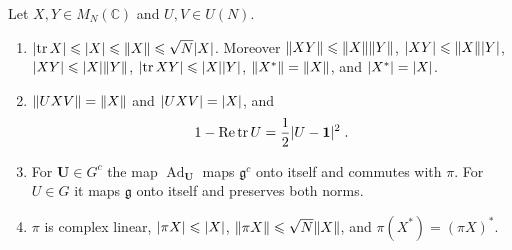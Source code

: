 \documentclass[11pt]{preprint}
\newcommand{\id}{\mathbf 1}
\newcommand{\re}{\operatorname{Re}}
\newcommand{\Ad}{\operatorname{Ad}}
\DeclarePairedDelimiter{\abs}{\lvert}{\rvert}
\DeclarePairedDelimiter{\norm}{\lVert}{\rVert}
\numberwithin{equation}{section}
\begin{document}
\begin{lemma}\label{lem:norms}
Let $X, Y \in M_N(\mathbb C)$ and $U, V \in U(N)$.
\begin{enumerate}[label=(\roman*)]
\item $\abs{\tr X} \leqslant \abs X \leqslant \norm X \leqslant \sqrt N\abs X$. Moreover $\norm{XY} \leqslant \norm X\norm Y$, $\abs{XY} \leqslant \norm X\abs Y$, $\abs{XY} \leqslant \abs X\norm Y$, $\abs{\tr XY} \leqslant \abs X\abs Y$, $\norm{X^*} = \norm X$, and $\abs{X^*} = \abs X$.
\item $\norm{UXV} = \norm X$ and $\abs{UXV} = \abs X$, and
\begin{equation}\label{eq:plaquette-norm}
    1 - \re\tr U = \frac{1}{2}\abs{U - \id}^2\;.
\end{equation}
\item For $\mathbf U \in G^c$ the map $\Ad_{\mathbf U}$ maps $\mathfrak g^c$ onto itself and commutes with $\pi$. For $U \in G$ it maps $\mathfrak g$ onto itself and preserves both norms.
\item $\pi$ is complex linear, $\abs{\pi X} \leqslant \abs X$, $\norm{\pi X} \leqslant \sqrt N\norm X$, and $\pi(X^*) = (\pi X)^*$.
\end{enumerate}
\end{lemma}
\end{document}
